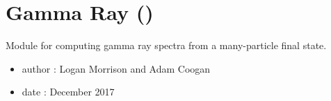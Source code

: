 \documentclass[letterpaper,10pt,english]{sphinxmanual}
\begin{document}
\section{Gamma Ray ()}
\label{\detokenize{modules:module-hazma.gamma_ray}}\label{\detokenize{modules:gamma-ray-hazma-gamma-ray}}
Module for computing gamma ray spectra from a many-particle final state.
\begin{itemize}
\item {} 
author : Logan Morrison and Adam Coogan

\item {} 
date : December 2017

\end{itemize}
\end{document}
